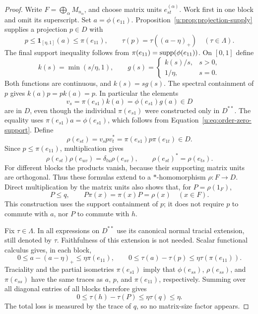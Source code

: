 \begin{proof}
Write $F=\bigoplus_{\alpha}M_{n_\alpha}$, and choose matrix units
$e^{(\alpha)}_{st}$.  Work first in one block and omit its superscript.
Set $a=\phi(e_{11})$.  Proposition~\ref{u:prop:projection-supply} supplies
a projection $p\in D$ with
\[
 p\le\mathbf1_{[\eta,1]}(a)\le\pi(e_{11}),
 \qquad \tau(p)=\tau((a-\eta)_+)
 \quad(\tau\in\Lambda).
\]
The final support inequality follows from
$\pi(e_{11})=\operatorname{supp}(\phi(e_{11}))$.  On $[0,1]$ define
\[
 k(s)=\min(s/\eta,1),\qquad
 g(s)=
 \begin{cases}k(s)/s,&s>0,\\1/\eta,&s=0.\end{cases}
\]
Both functions are continuous, and $k(s)=s g(s)$.  The spectral
containment of $p$ gives $k(a)p=pk(a)=p$.  In particular the elements
\begin{equation}
 v_s=\pi(e_{s1})k(a)=\phi(e_{s1})g(a)\in D
 \label{u:eq:replacement-membership}
\end{equation}
are in $D$, even though the individual $\pi(e_{s1})$ were constructed
only in $D^{**}$.  The equality uses
$\pi(e_{s1})a=\phi(e_{s1})$, which follows from
Equation~\eqref{u:eq:order-zero-support}.  Define
\[
 \rho(e_{st})=v_s p v_t^*
             =\pi(e_{s1})p\pi(e_{1t})\in D.
\]
Since $p\le\pi(e_{11})$, multiplication gives
\[
 \rho(e_{st})\rho(e_{uv})=\delta_{tu}\rho(e_{sv}),
 \qquad \rho(e_{st})^*=\rho(e_{ts}).
\]
For different blocks the products vanish, because their supporting
matrix units are orthogonal.  Thus these formulas extend to a
$*$-homomorphism $\rho:F\to D$.  Direct multiplication by the matrix
units also shows that, for $P=\rho(1_F)$,
\[
 P\le q,\qquad P\pi(x)=\pi(x)P=\rho(x)\quad(x\in F).
\]
This construction uses the support containment of $p$; it does not
require $p$ to commute with $a$, nor $P$ to commute with $h$.

Fix $\tau\in\Lambda$.  In all expressions on $D^{**}$ use its canonical
normal tracial extension, still denoted by $\tau$.  Faithfulness of this
extension is not needed.  Scalar functional calculus gives, in each
block,
\[
 0\le a-(a-\eta)_+\le\eta\pi(e_{11}),
 \qquad
 0\le\tau(a)-\tau(p)\le\eta\tau(\pi(e_{11})).
\]
Traciality and the partial isometries $\pi(e_{s1})$ imply that
$\phi(e_{ss})$, $\rho(e_{ss})$, and $\pi(e_{ss})$ have the same traces as
$a$, $p$, and $\pi(e_{11})$, respectively.  Summing over all diagonal
entries of all blocks therefore gives
\begin{equation}
 0\le\tau(h)-\tau(P)\le\eta\tau(q)\le\eta.
 \label{u:eq:replacement-unit-loss}
\end{equation}
The total loss is measured by the trace of $q$, so no matrix-size factor
appears.


\end{proof}

